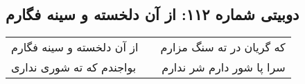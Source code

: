 \begin{center}
\section*{دوبیتی شماره ۱۱۲: از آن دلخسته و سینه فگارم}
\label{sec:112}
\begin{longtable}{l p{0.5cm} r}
از آن دلخسته و سینه فگارم
&&
که گریان در ته سنگ مزارم
\\
بواجندم که ته شوری نداری
&&
سرا پا شور دارم شر ندارم
\\
\end{longtable}
\end{center}
